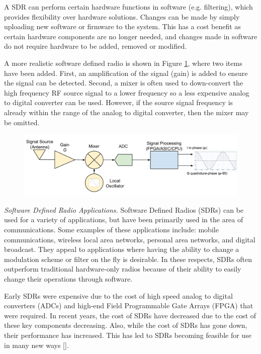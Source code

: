 A SDR can perform certain hardware functions in software (e.g. filtering), which provides flexibility over hardware solutions.  Changes can be made by simply uploading new software or firmware to the system.  This has a cost benefit as certain hardware components are no longer needed, and changes made in software do not require hardware to be added, removed or modified.

A more realistic software defined radio is shown in Figure \ref{prac_sdr}, where two items have been added.  First, an amplification of the signal (gain) is added to ensure the signal can be detected.  Second, a mixer is often used to down-convert the high frequency RF source signal to a lower frequency so a less expensive analog to digital converter can be used.  However, if the source signal frequency is already within the range of the analog to digital converter, then the mixer may be omitted.   

{\begin{figure}[h!tb] 
\centering
\includegraphics[width=\textwidth]{Images/SDR_Prac_block.pdf}
\label{prac_sdr}
\end{figure}
}

\emph{Software Defined Radio Applications.}  Software Defined Radios (SDRs) can be used for a variety of applications, but have been primarily used in the area of communications.  Some examples of these applications include:  mobile communications, wireless local area networks, personal area networks, and digital broadcast.  They appeal to applications where having the ability to change a modulation scheme or filter on the fly is desirable.  In these respects, SDRs often outperform traditional hardware-only radios because of their ability to easily change their operations through software.  

Early SDRs were expensive due to the cost of high speed analog to digital converters (ADCs) and high-end Field Programmable Gate Arrays (FPGA) that were required.  In recent years, the cost of SDRs have decreased due to the cost of these key components decreasing.  Also, while the cost of SDRs has gone down, their performance has increased.  This has led to SDRs becoming feasible for use in many new ways [\cite{jondral2005software}].

